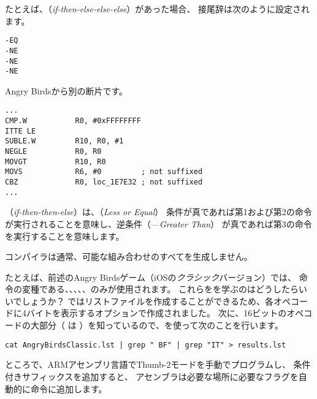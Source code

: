 たとえば、（\emph{if-then-else-else-else}）があった場合、
接尾辞は次のように設定されます。

\begin{lstlisting}
-EQ
-NE
-NE
-NE
\end{lstlisting}

Angry Birdsから別の断片です。

\begin{lstlisting}[caption=Angry Birds Classic,style=customasmARM]
...
CMP.W           R0, #0xFFFFFFFF
ITTE LE
SUBLE.W         R10, R0, #1
NEGLE           R0, R0
MOVGT           R10, R0
MOVS            R6, #0         ; not suffixed
CBZ             R0, loc_1E7E32 ; not suffixed
...
\end{lstlisting}

（\emph{if-then-then-else}）は、（\emph{Less or Equal}）
条件が真であれば第1および第2の命令が実行されることを意味し、逆条件（---\emph{Greater Than}）
が真であれば第3の命令を実行することを意味します。

コンパイラは通常、可能な組み合わせのすべてを生成しません。

たとえば、前述のAngry Birdsゲーム（iOSの\emph{クラシック}バージョン）では、
命令の変種である、、、、、のみが使用されます。 
\myindex{\GrepUsage}
これらをを学ぶのはどうしたらいいでしょうか？
\IDA ではリストファイルを作成することができるため、各オペコードに4バイトを表示するオプションで作成されました。 
次に、16ビットのオペコードの大部分（ は ）を知っているので、を使って次のことを行います。

\begin{lstlisting}
cat AngryBirdsClassic.lst | grep " BF" | grep "IT" > results.lst
\end{lstlisting}


ところで、ARMアセンブリ言語でThumb-2モードを手動でプログラムし、
条件付きサフィックスを追加すると、
アセンブラは必要な場所に必要なフラグを自動的に命令に追加します。

\myparagraph{\NonOptimizingXcodeIV (\ARMMode)}

